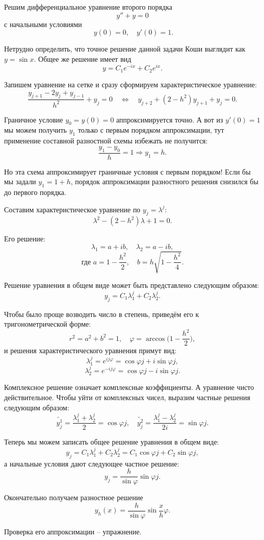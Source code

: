 \documentclass[../main.tex]{subfile}
\begin{document}
\begin{example}
	Решим дифференциальное уравнение второго порядка
	\[y''+y=0\]
	с начальными условиями
	\[\;y(0)=0,\quad y'(0)=1.\]

	Нетрудно определить, что точное решение данной задачи Коши
	выглядит как $y=\sin x$. Общее же решение имеет вид
	\[y=C_1e^{-ix}+C_2e^{ix}.\]

	Запишем уравнение на сетке и сразу сформируем характеристическое
	уравнение:
	\[\frac{y_{j+1}-2y_j+y_{j-1}}{h^2}+y_j=0 \quad\Leftrightarrow\quad
	y_{j+2}+(2-h^2)y_{j+1}+y_j=0.\]

	Граничное условие $y_0=y(0)=0$ аппроксимируется точно. А вот из
	$y'(0)=1$ мы можем получить $y_1$ только с первым порядком
	аппроксимации, тут применение составной разностной схемы избежать не
	получится:
	\[\frac{y_1-y_0}{h}=1\Rightarrow y_1=h.\]

	Но эта схема аппроксимирует граничные условия с первым порядком! Если бы
	мы задали $y_1=1+h$, порядок аппроксимации разностного решения снизился
	бы до первого порядка.

	Составим характеристическое уравнение по $y_j=\lambda^j$:
	\[\lambda^2-(2-h^2)\lambda+1=0.\]

	Его решение:
	\[\lambda_1=a+ib,\quad\lambda_2=a-ib,\]
	\[\text{где } a=1-\frac{h^2}{2},\quad b=h\sqrt{1-\frac{h^2}{4}}.\]

	Решение уравнения в общем виде может быть представлено следующим образом:
	\[y_j=C_1\lambda_1^j+C_2\lambda_2^j.\]

	Чтобы было проще возводить число в степень, приведём его к
	тригонометрической форме:
	\[r^2=a^2+b^2=1,\quad\varphi=\arccos{\Big(1-\frac{h^2}{2}\Big)},\]
	и решения характеристического уравнения примут вид:
	\[\lambda_1^j=e^{ij\varphi}=\cos{\varphi j}+i\sin{\varphi j},\]
	\[\lambda_2^j=e^{-ij\varphi}=\cos{\varphi j}-i\sin{\varphi j}.\]

	Комплексное решение означает комплексные коэффициенты. А уравнение
	чисто действительное. Чтобы уйти от комплексных чисел, выразим
	частные решения следующим образом:
	\[\widetilde{y_j^1}=\frac{\lambda_1^j+\lambda_2^j}{2}=\cos{\varphi j},
	\quad\widetilde{y_j^2}=\frac{\lambda_1^j-\lambda_2^j}{2i}=
	\sin{\varphi j}.\]

	Теперь мы можем записать общее решение уравнения в общем виде:
	\[y_j=C_1\lambda_1^j+C_2\lambda_2^j=C_1\cos{\varphi j}+C_2
	\sin{\varphi j},\]
	а начальные условия дают следующее частное решение:
	\[y_j=\frac{h}{\sin\varphi}\sin{\varphi j}.\]

	Окончательно получаем разностное решение
	\[y_h(x)=\frac{h}{\sin\varphi}\sin{\frac{x}{h}\varphi}.\]

	Проверка его аппроксимации -- упражнение.
\end{example}
\end{document}

